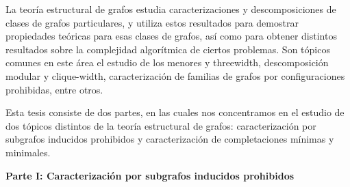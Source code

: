 \documentclass[12pt]{book}
\theoremstyle{plain}
\theoremstyle{remark}
\begin{document}
La teoría estructural de grafos estudia caracterizaciones y descomposiciones de clases de grafos particulares, y utiliza estos resultados para demostrar propiedades teóricas para esas clases de grafos, así como para obtener distintos resultados sobre la complejidad algorítmica de ciertos problemas.
Son tópicos comunes en este área el estudio de los menores y threewidth, descomposición modular y clique-width, caracterización de familias de grafos por configuraciones prohibidas, entre otros.

Esta tesis consiste de dos partes, en las cuales nos concentramos en el estudio de dos tópicos distintos de la teoría estructural de grafos: caracterización por subgrafos inducidos prohibidos y caracterización de completaciones mínimas y minimales.

\vspace{3mm}
\textbf{Parte I: Caracterización por subgrafos inducidos prohibidos}
\vspace{3mm}
\end{document}
